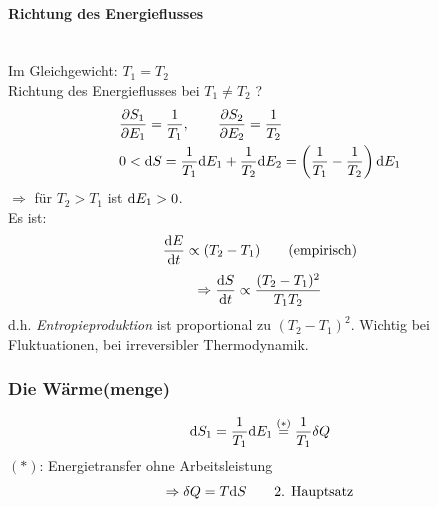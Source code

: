 \paragraph{Richtung des Energieflusses} \mbox{}\\ 
Im Gleichgewicht: $T_1 = T_2$ \\
Richtung des Energieflusses bei $T_1 \neq T_2$ ?
\begin{equation}
    \begin{split}
        & \frac{\partial S_1}{\partial E_1} = \frac{1}{T_1}, \qquad \frac{\partial S_2}{\partial E_2} = \frac{1}{T_2} \\
        & 0 < \mathrm{d} S = \frac{1}{T_1} \mathrm{d} E_1 + \frac{1}{T_2} \mathrm{d} E_2 = \left( \frac{1}{T_1} - \frac{1}{T_2} \right) \mathrm{d} E_1
    \end{split}
\end{equation}
$\Rightarrow$ für $T_2 > T_1$ ist $\mathrm{d} E_1 > 0$. \\
Es ist:
\begin{equation}
    \frac{\mathrm{d} E}{\mathrm{d} t} \propto (T_2 - T_1) \qquad \text{(empirisch)}
\end{equation}
\begin{equation}
    \Rightarrow \frac{\mathrm{d} S}{\mathrm{d} t} \propto \frac{(T_2 - T_1)^2}{T_1 T_2}
\end{equation}
d.h. \emph{Entropieproduktion} ist proportional zu $(T_2 - T_1)^2$. Wichtig bei Fluktuationen, bei irreversibler Thermodynamik.

\subsubsection{Die Wärme(menge)}
\begin{equation}
    \mathrm{d} S_1 = \frac{1}{T_1} \mathrm{d} E_1 \overset{(*)}{=} \frac{1}{T_1} \delta Q
\end{equation}
$(*)$: Energietransfer ohne Arbeitsleistung
\begin{equation}
    \Rightarrow \delta Q = T \mathrm{d} S \qquad \text{2. Hauptsatz}
\end{equation}
